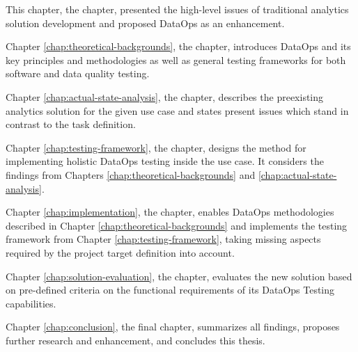 This chapter, the  chapter, presented the high-level issues of traditional analytics solution development and proposed DataOps as an enhancement.

Chapter \ref{chap:theoretical-backgrounds}, the  chapter, introduces DataOps and its key principles and methodologies as well as general testing frameworks for both software and data quality testing.

Chapter \ref{chap:actual-state-analysis}, the  chapter, describes the preexisting analytics solution for the given use case and states present issues which stand in contrast to the task definition.

Chapter \ref{chap:testing-framework}, the  chapter, designs the method for implementing holistic DataOps testing inside the use case. It considers the findings from Chapters \ref{chap:theoretical-backgrounds} and \ref{chap:actual-state-analysis}.

Chapter \ref{chap:implementation}, the  chapter, enables DataOps methodologies described in Chapter \ref{chap:theoretical-backgrounds} and implements the testing framework from Chapter \ref{chap:testing-framework}, taking missing aspects required by the project target definition into account.

Chapter \ref{chap:solution-evaluation}, the  chapter, evaluates the new solution based on pre-defined criteria on the functional requirements of its DataOps Testing capabilities.

Chapter \ref{chap:conclusion}, the final  chapter, summarizes all findings, proposes further research and enhancement, and concludes this thesis.
